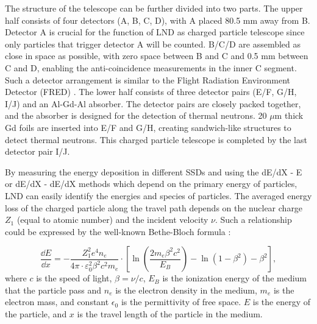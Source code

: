 The structure of the telescope can be further divided into two parts. The upper half consists of four detectors (A, B, C, D), with A placed 80.5 mm away from B. Detector A is crucial for the function of \ac{LND} as charged particle telescope since only particles that trigger detector A will be counted. B/C/D are assembled as close in space as possible, with zero space between B and C and 0.5 mm between C and D, enabling the anti-coincidence measurements in the inner C segment. Such a detector arrangement is similar to the Flight Radiation Environment Detector (FRED) \citep{moeller-etal-2013, moeller-etal-2013b}. The lower half consists of three detector pairs (E/F, G/H, I/J) and an Al-Gd-Al absorber. The detector pairs are closely packed together, and the absorber is designed for the detection of thermal neutrons. 20 $\mu$m thick Gd foils are inserted into E/F and G/H, creating sandwich-like structures to detect thermal neutrons. This charged particle telescope is completed by the last detector pair I/J.

By measuring the energy deposition in different \acp{SSD} and using the dE/dX - E or dE/dX - dE/dX methods which depend on the primary energy of particles, LND can easily identify the energies and species of particles. 
The averaged energy loss of the charged particle along the travel path depends on the nuclear charge $Z_1$ (equal to atomic number) and the incident velocity $\nu$. 
Such a relationship could be expressed by the well-known Bethe-Bloch formula \citep{bethe-1930, bloch-1933}:

\begin{equation}
    \frac{\dd E}{\dd x} = - \frac{Z_1^2 e^4 n_e}{4 \pi \cdot \varepsilon_0^2 \beta^2 c^2 m_e} \cdot \left[ \ln\left(\frac{2 m_e  \beta^2 c^2}{{E_B}}\right) - \ln(1 - \beta^2) - \beta^2  \right], 
    \label{eq:BB}
  \end{equation}
where $c$ is the speed of light, $\beta = \nu/c$, $E_B$ is the ionization energy of the medium that the particle pass and $n_e$ is the electron density in the medium, $m_e$ is the electron mass, and constant $\epsilon_0$ is the permittivity of free space. $E$ is the energy of the particle, and $x$ is the travel length of the particle in the medium.

